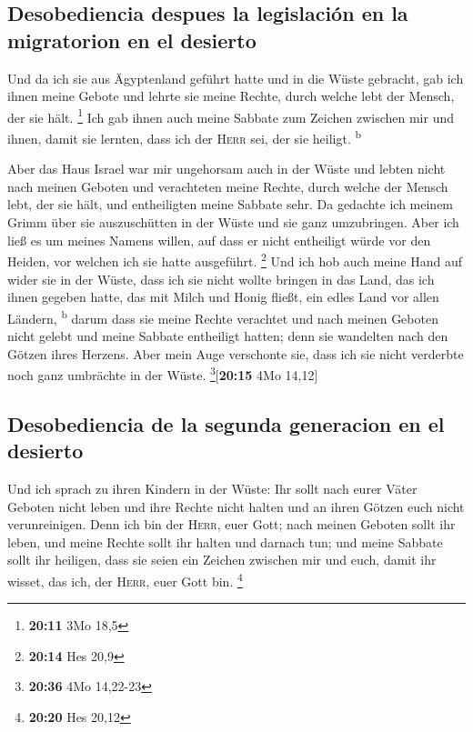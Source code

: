 \hypertarget{desobediencia-despues-la-legislaciuxf3n-en-la-migratorion-en-el-desierto}{%
\subsection{Desobediencia despues la legislación en la migratorion en el
desierto}\label{desobediencia-despues-la-legislaciuxf3n-en-la-migratorion-en-el-desierto}}

 Und da ich sie aus Ägyptenland geführt hatte und in die
Wüste gebracht,  gab ich ihnen meine Gebote und lehrte
sie meine Rechte, durch welche lebt der Mensch, der sie hält.
\footnote{\textbf{20:11} 3Mo 18,5}  Ich gab ihnen auch
meine Sabbate zum Zeichen zwischen mir und ihnen, damit sie lernten,
dass ich der \textsc{Herr} sei, der sie heiligt. \textsuperscript{b}

 Aber das Haus Israel war mir ungehorsam auch in der
Wüste und lebten nicht nach meinen Geboten und verachteten meine Rechte,
durch welche der Mensch lebt, der sie hält, und entheiligten meine
Sabbate sehr. Da gedachte ich meinem Grimm über sie auszuschütten in der
Wüste und sie ganz umzubringen.  Aber ich ließ es um
meines Namens willen, auf dass er nicht entheiligt würde vor den Heiden,
vor welchen ich sie hatte ausgeführt. \footnote{\textbf{20:14} Hes 20,9}
 Und ich hob auch meine Hand auf wider sie in der Wüste,
dass ich sie nicht wollte bringen in das Land, das ich ihnen gegeben
hatte, das mit Milch und Honig fließt, ein edles Land vor allen Ländern,
\textsuperscript{b}  darum dass sie meine Rechte
verachtet und nach meinen Geboten nicht gelebt und meine Sabbate
entheiligt hatten; denn sie wandelten nach den Götzen ihres Herzens.
 Aber mein Auge verschonte sie, dass ich sie nicht
verderbte noch ganz umbrächte in der Wüste. \footnote{\textbf{20:36} 4Mo
  14,22-23}{[}\textbf{20:15} 4Mo 14,12{]}

\hypertarget{desobediencia-de-la-segunda-generacion-en-el-desierto}{%
\subsection{Desobediencia de la segunda generacion en el
desierto}\label{desobediencia-de-la-segunda-generacion-en-el-desierto}}

 Und ich sprach zu ihren Kindern in der Wüste: Ihr sollt
nach eurer Väter Geboten nicht leben und ihre Rechte nicht halten und an
ihren Götzen euch nicht verunreinigen.  Denn ich bin der
\textsc{Herr}, euer Gott; nach meinen Geboten sollt ihr leben, und meine
Rechte sollt ihr halten und darnach tun;  und meine
Sabbate sollt ihr heiligen, dass sie seien ein Zeichen zwischen mir und
euch, damit ihr wisset, das ich, der \textsc{Herr}, euer Gott bin.
\footnote{\textbf{20:20} Hes 20,12}

